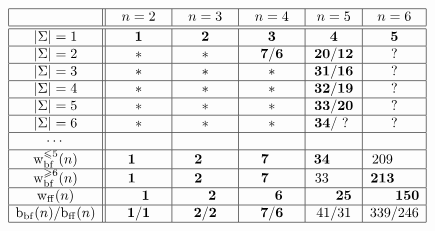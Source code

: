 \documentclass{llncs}
\renewcommand{\le}{\leqslant}
\renewcommand{\ge}{\geqslant}
\newcommand{\Sig}{\Sigma}
\newcommand{\bbf}{{\mathrm{b}_{\mathrm{bf}}}}
\newcommand{\bff}{{\mathrm{b}_{\mathrm{ff}}}}
\newcommand{\vbf}{{\mathrm{w}^{\le 5}_{\mathrm{bf}}}}
\newcommand{\wbf}{{\mathrm{w}^{\ge 6}_{\mathrm{bf}}}}
\newcommand{\wff}{{\mathrm{w}_{\mathrm{ff}}}}
\begin{document}
\begin{table}[H]
\caption{Syntactic complexities of bifix- and factor-free regular languages.}
\label{tab:Summary2}
\begin{center}
$
\begin{array}{|c||c|c|c|c|c|}    
\hline
\ \  \ \ &\ \ n = 2 \ \ & \ \ n=3 \  \ & \  \  n=4 \ \ 
&  \ n=5 \ & \ n=6 \ \\
\hline \hline

|\Sig|=1
&	{\bf 1}	&	{\bf 2}	&	{\bf 3}	
&	{\bf 4}	&	{\bf 5}	\\
\hline

|\Sig|=2 
&	\ast	&	\ast	&	{\bf 7}/{\bf 6} 
&	{\bf 20}/{\bf 12}	&	? \\
\hline

|\Sig|=3
&	\ast	&	\ast	&	\ast 
&	{\bf 31}/{\bf 16}	&	? \\
\hline

|\Sig|=4
&	\ast	&	\ast	&	\ast 
&	{\bf 32}/{\bf 19}	&	? \\
\hline

|\Sig|=5
&	\ast	&	\ast	&	\ast					
&	{\bf 33}/{\bf 20}	&	? \\
\hline

|\Sig|=6
&	\ast	&	\ast	&	\ast					
&	{\bf 34}/~?~		&	? \\
\hline

\cdots
&			&			&							
&			&				  \\
\hline

~\vbf(n)~
&\hspace{-.35cm}{\bf 1}	&\hspace{-.35cm}{\bf 2}	&\hspace{-.35cm}{\bf 7} 
&\hspace{-.6cm}{\bf 34}	&\hspace{-.6cm}209 \\
\hline

~\wbf(n)~
&\hspace{-.35cm}{\bf 1}	&\hspace{-.35cm}{\bf 2}	&\hspace{-.35cm}{\bf 7} 
&\hspace{-.6cm}33		&\hspace{-.6cm}{\bf 213} \\
\hline

~\wff(n)~
&\hspace{.35cm}{\bf 1}	&\hspace{.35cm}{\bf 2}	&\hspace{.35cm}{\bf 6}	
&\hspace{.5cm}{\bf 25}	&\hspace{.65cm}{\bf 150}  \\
\hline

\bbf(n)/\bff(n)
&{\bf 1}/{\bf 1}	&{\bf 2}/{\bf 2}	&{\bf 7}/{\bf 6}				
&41/31					&339/246	     \\
\hline

\end{array}
$
\end{center}
\label{table2}
\end{table}
\end{document}
